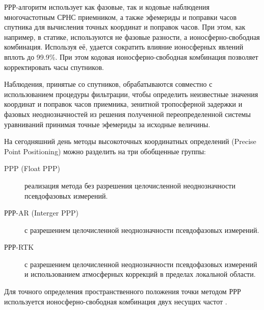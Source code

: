 РРР-алгоритм использует как фазовые, так и кодовые наблюдения многочастотным СРНС приемником, а также эфемериды и поправки часов спутника для вычисления точных координат и поправок часов. При этом, как например, в статике, используются не фазовые разности, а ионосферно-свободная комбинация. Используя её, удается сократить влияние ионосферных явлений вплоть до 99.9\%. При этом кодовая ионосферно-свободная комбинация позволяет корректировать часы спутников.

Наблюдения, принятые со спутников, обрабатываются совместно с использованием процедуры фильтрации, чтобы определить неизвестные значения координат и поправок часов приемника, зенитной тропосферной задержки и фазовых неоднозначностей из решения полученной переопределенной системы уравниваний принимая точные эфемериды за исходные величины.

На сегодняшний день методы высокоточных координатных определений (Precise Point Positioning) можно разделить на три обобщенные группы:
\begin{description}
	\item[PPP (Float PPP)] реализация метода без разрешения целочисленной неоднозначности псевдофазовых измерений.
	\item[РРР-AR (Interger PPP)] с разрешением целочисленной неоднозначности псевдофазовых измерений.
	\item[РРР-RTK] с разрешением целочисленной неоднозначности псевдофазовых измерений и использованием атмосферных коррекций в пределах локальной области.
\end{description}

Для точного определения пространственного положения точки методом РРР используется ионосферно-свободная комбинация двух несущих частот \cite{src03,src05,src12,src19}. 

